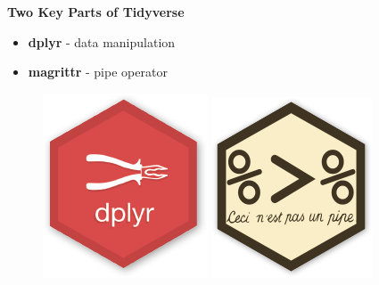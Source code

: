 \documentclass{beamer}
\begin{document}
\begin{frame}
		\vspace{-0.5cm}
		\LARGE
		\textbf{Two Key Parts of Tidyverse}
		
		\begin{itemize}
			\item \textbf{dplyr} - data manipulation
			
			
			\item \textbf{magrittr} - pipe operator
		\end{itemize}
		\begin{figure}
			\centering
			\includegraphics[width=0.35\linewidth]{images/dplyr-hexbin-logo}
			\includegraphics[width=0.35\linewidth]{images/magrittr}
		\end{figure}	
	\end{frame}

	
\end{document}
